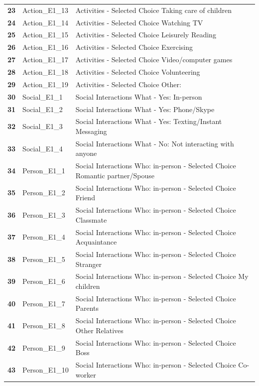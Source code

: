 \documentclass[
  letterpaper,
  DIV=11,
  numbers=noendperiod]{scrartcl}
\begin{document}
\begin{longtable}[t]{>{}cll}
\textbf{23} & Action\_E1\_13 & Activities - Selected Choice Taking care of children\\
\textbf{24} & Action\_E1\_14 & Activities - Selected Choice Watching TV\\
\textbf{25} & Action\_E1\_15 & Activities - Selected Choice Leisurely Reading\\
\addlinespace
\textbf{26} & Action\_E1\_16 & Activities - Selected Choice Exercising\\
\textbf{27} & Action\_E1\_17 & Activities - Selected Choice Video/computer games\\
\textbf{28} & Action\_E1\_18 & Activities - Selected Choice Volunteering\\
\textbf{29} & Action\_E1\_19 & Activities - Selected Choice Other:\\
\textbf{30} & Social\_E1\_1 & Social Interactions What - Yes: In-person\\
\addlinespace
\textbf{31} & Social\_E1\_2 & Social Interactions What - Yes: Phone/Skype\\
\textbf{32} & Social\_E1\_3 & Social Interactions What - Yes: Texting/Instant Messaging\\
\textbf{33} & Social\_E1\_4 & Social Interactions What - No: Not interacting with anyone\\
\textbf{34} & Person\_E1\_1 & Social Interactions Who: in-person - Selected Choice Romantic partner/Spouse\\
\textbf{35} & Person\_E1\_2 & Social Interactions Who: in-person - Selected Choice Friend\\
\addlinespace
\textbf{36} & Person\_E1\_3 & Social Interactions Who: in-person - Selected Choice Classmate\\
\textbf{37} & Person\_E1\_4 & Social Interactions Who: in-person - Selected Choice Acquaintance\\
\textbf{38} & Person\_E1\_5 & Social Interactions Who: in-person - Selected Choice Stranger\\
\textbf{39} & Person\_E1\_6 & Social Interactions Who: in-person - Selected Choice My children\\
\textbf{40} & Person\_E1\_7 & Social Interactions Who: in-person - Selected Choice Parents\\
\addlinespace
\textbf{41} & Person\_E1\_8 & Social Interactions Who: in-person - Selected Choice Other Relatives\\
\textbf{42} & Person\_E1\_9 & Social Interactions Who: in-person - Selected Choice Boss\\
\textbf{43} & Person\_E1\_10 & Social Interactions Who: in-person - Selected Choice Co-worker\\

\end{longtable}
\end{document}
